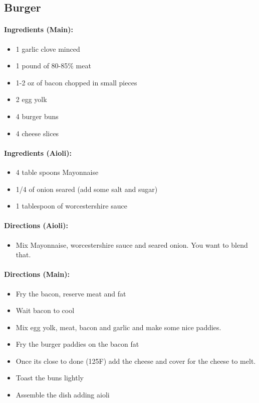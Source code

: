 \documentclass{article}
\begin{document}
\subsection{Burger}

\paragraph{Ingredients (Main):}
\begin{itemize}
	\item 1 garlic clove minced
	\item 1 pound of 80-85\% meat
	\item 1-2 oz of bacon chopped in small pieces
	\item 2 egg yolk
	\item 4 burger buns
	\item 4 cheese slices
\end{itemize}

\paragraph{Ingredients (Aioli):}
\begin{itemize}
	\item 4 table spoons Mayonnaise
	\item 1/4 of onion seared (add some salt and sugar)
	\item 1 tablespoon of worcestershire sauce
\end{itemize}


\paragraph{Directions (Aioli):}
\begin{itemize}
	\item Mix Mayonnaise, worcestershire sauce and seared onion. You want to blend that.
\end{itemize}

\paragraph{Directions (Main):}
\begin{itemize}
	\item Fry the bacon, reserve meat and fat
	\item Wait bacon to cool
	\item Mix egg yolk, meat, bacon and garlic and make some nice paddies.
	\item Fry the burger paddies on the bacon fat
	\item Once its close to done (125F) add the cheese and cover for the cheese to melt.
	\item Toast the buns lightly
	\item Assemble the dish adding aioli
\end{itemize}
\end{document}
